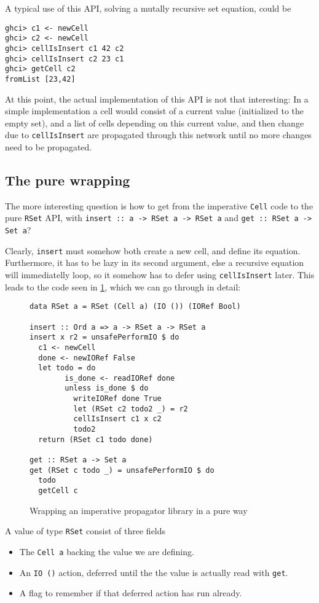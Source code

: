 \documentclass[manuscript,screen,acmsmall]{acmart}
\begin{document}
A typical use of this API, solving a mutally recursive set equation, could be
\begin{verbatim}
ghci> c1 <- newCell
ghci> c2 <- newCell
ghci> cellIsInsert c1 42 c2
ghci> cellIsInsert c2 23 c1
ghci> getCell c2
fromList [23,42]
\end{verbatim}

At this point, the actual implementation of this API is not that interesting: In a simple implementation a cell would consist of a current value (initialized to the empty set), and a list of cells depending on this current value, and then change due to \verb|cellIsInsert| are propagated through this network until no more changes need to be propagated.

\subsection{The pure wrapping}

The more interesting question is how to get from the imperative \verb|Cell| code to the pure \verb|RSet| API, with \verb|insert :: a -> RSet a -> RSet a| and \verb|get :: RSet a -> Set a|?

Clearly, \verb|insert| must somehow both create a new cell, and define its equation.
Furthermore, it has to be lazy in its second argument, else a recursive equation will immediatelly loop, so it somehow has to defer using \verb|cellIsInsert| later. This leads to the code seen in \cref{fig:wrap}, which we can go through in detail:

\begin{figure}
\begin{verbatim}
data RSet a = RSet (Cell a) (IO ()) (IORef Bool)

insert :: Ord a => a -> RSet a -> RSet a
insert x r2 = unsafePerformIO $ do
  c1 <- newCell
  done <- newIORef False
  let todo = do
        is_done <- readIORef done
        unless is_done $ do
          writeIORef done True
          let (RSet c2 todo2 _) = r2
          cellIsInsert c1 x c2
          todo2
  return (RSet c1 todo done)

get :: RSet a -> Set a
get (RSet c todo _) = unsafePerformIO $ do
  todo
  getCell c
\end{verbatim}
\caption{Wrapping an imperative propagator library in a pure way}\label{fig:wrap}
\end{figure}

A value of type \verb|RSet| consist of three fields
\begin{itemize}
\item The \verb|Cell a| backing the value we are defining.
\item An \verb|IO ()| action, deferred until the the value is actually read with \verb|get|.
\item A flag to remember if that deferred action has run already.
\end{itemize}
\end{document}
